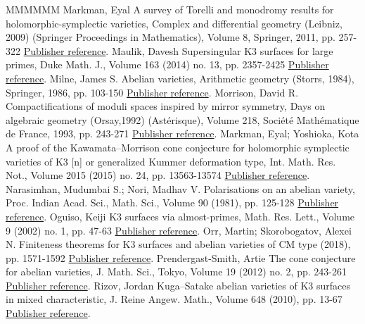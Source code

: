 \begin{thebibliography}{MMMMMM}
 Markman, Eyal A survey of Torelli and monodromy results for holomorphic-symplectic varieties, Complex and differential geometry (Leibniz, 2009) (Springer Proceedings in Mathematics), Volume 8, Springer, 2011, pp. 257-322 \href{https://ahl.centre-mersenne.org/item/AHL_2018__1__227_0/#Mar}{Publisher reference}.
 Maulik, Davesh Supersingular K3 surfaces for large primes, Duke Math. J., Volume 163 (2014) no. 13, pp. 2357-2425 \href{https://ahl.centre-mersenne.org/item/AHL_2018__1__227_0/#Maulik}{Publisher reference}.
 Milne, James S. Abelian varieties, Arithmetic geometry (Storrs, 1984), Springer, 1986, pp. 103-150 \href{https://ahl.centre-mersenne.org/item/AHL_2018__1__227_0/#Milne}{Publisher reference}.
 Morrison, David R. Compactifications of moduli spaces inspired by mirror symmetry, Days on algebraic geometry (Orsay,1992) (Astérisque), Volume 218, Société Mathématique de France, 1993, pp. 243-271 \href{https://ahl.centre-mersenne.org/item/AHL_2018__1__227_0/#Mor}{Publisher reference}.
 Markman, Eyal; Yoshioka, Kota A proof of the Kawamata–Morrison cone conjecture for holomorphic symplectic varieties of K3 [n]  or generalized Kummer deformation type, Int. Math. Res. Not., Volume 2015 (2015) no. 24, pp. 13563-13574 \href{https://ahl.centre-mersenne.org/item/AHL_2018__1__227_0/#MarYos}{Publisher reference}.
 Narasimhan, Mudumbai S.; Nori, Madhav V. Polarisations on an abelian variety, Proc. Indian Acad. Sci., Math. Sci., Volume 90 (1981), pp. 125-128 \href{https://ahl.centre-mersenne.org/item/AHL_2018__1__227_0/#NarNor}{Publisher reference}.
 Oguiso, Keiji K3 surfaces via almost-primes, Math. Res. Lett., Volume 9 (2002) no. 1, pp. 47-63 \href{https://ahl.centre-mersenne.org/item/AHL_2018__1__227_0/#Og}{Publisher reference}.
 Orr, Martin; Skorobogatov, Alexei N. Finiteness theorems for K3 surfaces and abelian varieties of CM type (2018), pp. 1571-1592 \href{https://ahl.centre-mersenne.org/item/AHL_2018__1__227_0/#OS}{Publisher reference}.
 Prendergast-Smith, Artie The cone conjecture for abelian varieties, J. Math. Sci., Tokyo, Volume 19 (2012) no. 2, pp. 243-261 \href{https://ahl.centre-mersenne.org/item/AHL_2018__1__227_0/#PS}{Publisher reference}.
 Rizov, Jordan Kuga–Satake abelian varieties of K3 surfaces in mixed characteristic, J. Reine Angew. Math., Volume 648 (2010), pp. 13-67 \href{https://ahl.centre-mersenne.org/item/AHL_2018__1__227_0/#Rizov}{Publisher reference}.

\end{thebibliography}

